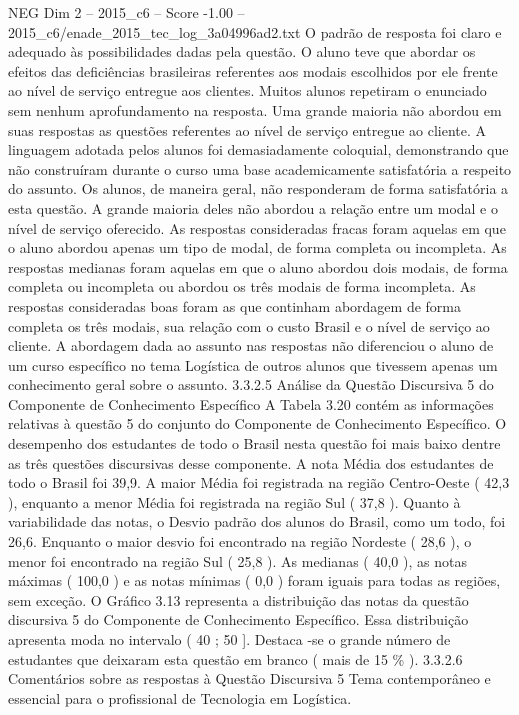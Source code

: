\begin{textsample}{NEG Dim 2 – 2015\_c6 – Score -1.00 – 2015\_c6/enade\_2015\_tec\_log\_3a04996ad2.txt}
O padrão de resposta foi claro e adequado às possibilidades dadas pela questão.
O aluno teve que abordar os efeitos das deficiências brasileiras referentes aos modais escolhidos por ele frente ao nível de serviço entregue aos clientes.
Muitos alunos repetiram o enunciado sem nenhum aprofundamento na resposta.
Uma grande maioria não abordou em suas respostas as questões referentes ao nível de serviço entregue ao cliente.
A linguagem adotada pelos alunos foi demasiadamente coloquial, demonstrando que não construíram durante o curso uma base academicamente satisfatória a respeito do assunto.
Os alunos, de maneira geral, não responderam de forma satisfatória a esta questão.
A grande maioria deles não abordou a relação entre um modal e o nível de serviço oferecido.
As respostas consideradas fracas foram aquelas em que o aluno abordou apenas um tipo de modal, de forma completa ou incompleta.
As respostas medianas foram aquelas em que o aluno abordou dois modais, de forma completa ou incompleta ou abordou os três modais de forma incompleta.
As respostas consideradas boas foram as que continham abordagem de forma completa os três modais, sua relação com o custo Brasil e o nível de serviço ao cliente.
A abordagem dada ao assunto nas respostas não diferenciou o aluno de um curso específico no tema Logística de outros alunos que tivessem apenas um conhecimento geral sobre o assunto. 3.3.2.5 Análise da Questão Discursiva 5 do Componente de Conhecimento Específico A Tabela 3.20 contém as informações relativas à questão 5 do conjunto do Componente de Conhecimento Específico.
O desempenho dos estudantes de todo o Brasil nesta questão foi mais baixo dentre as três questões discursivas desse componente.
A nota Média dos estudantes de todo o Brasil foi 39,9.
A maior Média foi registrada na região Centro-Oeste ( 42,3 ), enquanto a menor Média foi registrada na região Sul ( 37,8 ).
Quanto à variabilidade das notas, o Desvio padrão dos alunos do Brasil, como um todo, foi 26,6.
Enquanto o maior desvio foi encontrado na região Nordeste ( 28,6 ), o menor foi encontrado na região Sul ( 25,8 ).
As medianas ( 40,0 ), as notas máximas ( 100,0 ) e as notas mínimas ( 0,0 ) foram iguais para todas as regiões, sem exceção.
O Gráfico 3.13 representa a distribuição das notas da questão discursiva 5 do Componente de Conhecimento Específico.
Essa distribuição apresenta moda no intervalo ( 40 ; 50 ].
Destaca -se o grande número de estudantes que deixaram esta questão em branco ( mais de 15 \% ). 3.3.2.6 Comentários sobre as respostas à Questão Discursiva 5 Tema contemporâneo e essencial para o profissional de Tecnologia em Logística.

\end{textsample}
